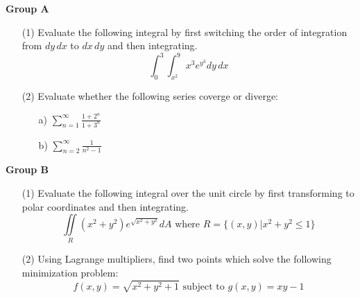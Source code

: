 \documentclass[12pt, amssymb, one column]{article}
\begin{document}
\noindent \textbf{\large{Group A}}

\begin{itemize}
	\item[(1)]  Evaluate the following integral by first switching the order of integration from $dy\,dx$ to $dx \, dy$ and then integrating.
	$$\int_0^3 \int_{x^2}^9 x^3 e^{y^3} dy\,dx$$	
	\item[(2)] Evaluate whether the following series coverge or diverge:
	\begin{itemize}
		\item[a)] $\sum_{n=1}^{\infty} \frac{1+2^n}{1+3^n}$
		\item[b)] $\sum_{n=2}^{\infty} \frac{1}{n^2-1}$
	\end{itemize}
\end{itemize}



\pagebreak


\noindent \textbf{\large{Group B}}
\begin{itemize}
	\item[(1)] Evaluate the following integral over the unit circle by first transforming to polar coordinates and then integrating.
	$$\iint\limits_{R} (x^2+y^2)e^{\sqrt{x^2+y^2}} dA \mbox{ where } R=\{(x,y)| x^2+y^2 \leq 1\}$$
	\item[(2)] Using Lagrange multipliers, find two points which solve the following minimization problem:
	$$f(x,y) = \sqrt{x^2+y^2+1} \mbox{ subject to } g(x,y)= xy-1$$
\end{itemize} 
\end{document}
